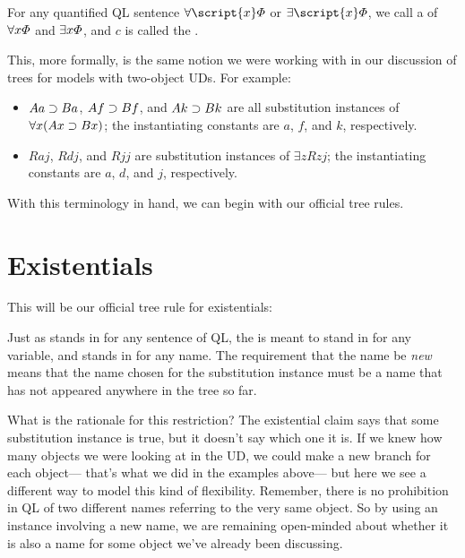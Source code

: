 For any quantified QL sentence $\forall \script{x} \metaA{}$ or $\exists \script{x} \metaA{}$, we call \metaA{} a  of $\forall x\varPhi{}$ and $\exists x\varPhi{}$, and $c$ is called the .

This, more formally, is the same notion we were working with in our discussion of trees for models with two-object UDs. For example:

\begin{itemize}
\item $Aa \supset Ba$, $Af \supset Bf$, and $Ak \supset Bk$ are all substitution instances of $\forall x(Ax \supset Bx)$; the instantiating constants are $a$, $f$, and $k$, respectively.
\item $Raj$, $Rdj$, and $Rjj$ are substitution instances of $\exists zRzj$; the instantiating constants are $a$, $d$, and $j$, respectively.
\end{itemize}

With this terminology in hand, we can begin with our official tree rules.

\section{Existentials}

This will be our official tree rule for existentials:


Just as \metaA{} stands in for any sentence of QL, the  is meant to stand in for any variable, and  stands in for any name. The requirement that the name be \emph{new} means that the name chosen for the substitution instance must be a name that has not appeared anywhere in the tree so far. 

What is the rationale for this restriction? The existential claim says that some substitution instance is true, but it doesn't say which one it is. If we knew how many objects we were looking at in the UD, we could make a new branch for each object--- that's what we did in the examples above--- but here we see a different way to model this kind of flexibility. Remember, there is no prohibition in QL of two different names referring to the very same object. So by using an instance involving a new name, we are remaining open-minded about whether it is also a name for some object we've already been discussing.

